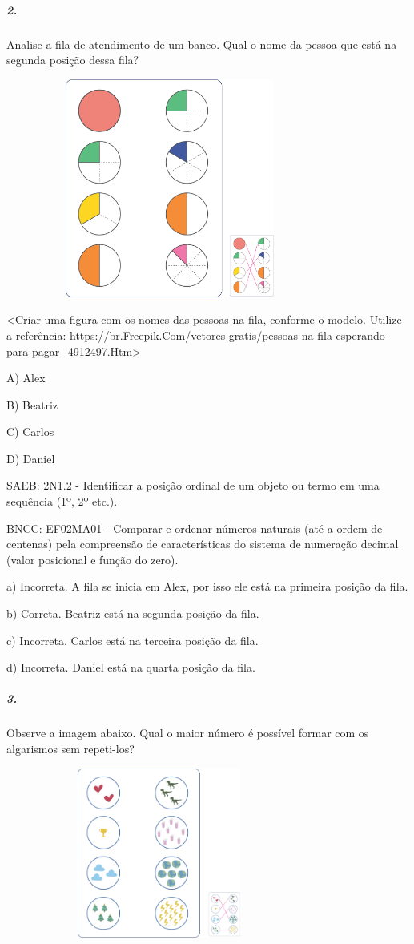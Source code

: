 \subparagraph{2. }\label{section-101}

Analise a fila de atendimento de um banco. Qual o nome da pessoa que
está na segunda posição dessa fila?

\includegraphics[width=4.25000in,height=2.83333in]{media/image106.png}

\textless{}Criar uma figura com os nomes das pessoas na fila, conforme o
modelo. Utilize a referência:
https://br.Freepik.Com/vetores-gratis/pessoas-na-fila-esperando-para-pagar\_4912497.Htm\textgreater{}

A) Alex

B) Beatriz

C) Carlos

D) Daniel

SAEB: 2N1.2 - Identificar a posição ordinal de um objeto ou termo em uma
sequência (1º, 2º etc.).

BNCC: EF02MA01 - Comparar e ordenar números naturais (até a ordem de
centenas) pela compreensão de características do sistema de numeração
decimal (valor posicional e função do zero).

a) Incorreta. A fila se inicia em Alex, por isso ele está na primeira
posição da fila.

b) Correta. Beatriz está na segunda posição da fila.

c) Incorreta. Carlos está na terceira posição da fila.

d) Incorreta. Daniel está na quarta posição da fila.

\subparagraph{3. }\label{section-102}

Observe a imagem abaixo. Qual o maior número é possível formar com os
algarismos sem repeti-los?

\includegraphics[width=3.96880in,height=2.19793in]{media/image107.png}

